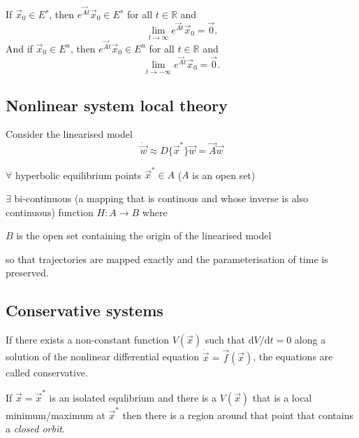 \begin{theorem}
	If $\vec x_0 \in E^s$, then $e^{\vec At}\vec x_0 \in E^s$ for all $t \in \mathbb R$ and
	\begin{equation*}
		\lim_{t \to \infty} e^{\vec At} \vec x_0 = \vec 0.
	\end{equation*}
	And if $\vec x_0 \in E^u$, then $e^{\vec At}\vec x_0 \in E^u$ for all $t \in \mathbb R$ and
	\begin{equation*}
		\lim_{t \to -\infty} e^{\vec At} \vec x_0 = \vec 0.
	\end{equation*}
\end{theorem}

\subsection{Nonlinear system local theory}
Consider the linearised model
\begin{equation*}
	\dot{\vec w} \approx D\{\vec x^\ast\} \vec w = \vec A \vec w
\end{equation*}

\begin{theorem}
	$\forall$ hyperbolic equilibrium points $\vec x^\ast \in A$ ($A$ is an open set)

	$\exists$ bi-continuous (a mapping that is continous and whose inverse is also continuous) function $H: A \to B$ where

	$B$ is the open set containing the origin of the linearised model

	so that trajectories are mapped exactly and the parameterisation of time is preserved.
\end{theorem}

\subsection{Conservative systems}
If there exists a non-constant function $V(\vec x)$ such that $\mathrm dV / \mathrm dt = 0$ along a solution of the nonlinear differential equation $\dot{\vec x} = \vec f(\vec x)$, the equations are called conservative.

If $\vec x = \vec x^\ast$ is an isolated equlibrium and there is a $V(\vec x)$ that is a local minimum/maximum at $\vec x^\ast$ then there is a region around that point that contains a \emph{closed orbit}.